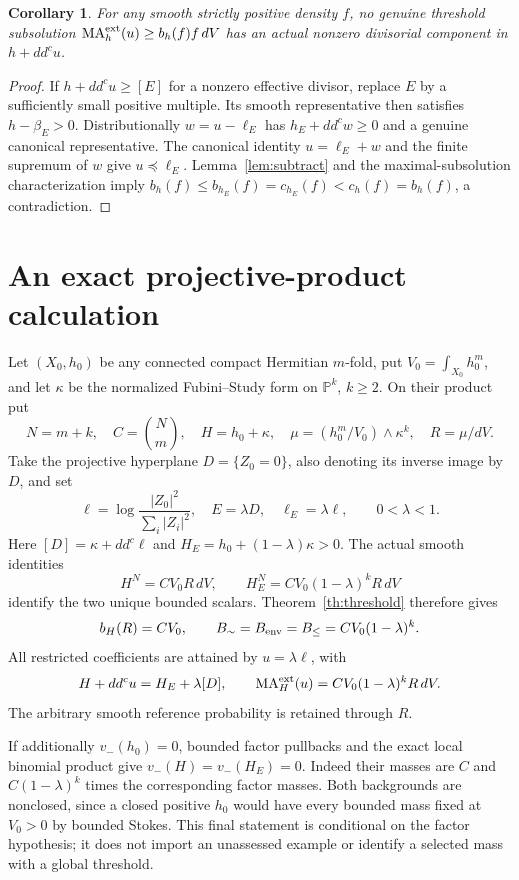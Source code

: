 \documentclass[11pt]{article}
\newcommand{\ddc}{dd^c}
\newcommand{\MA}{\operatorname{MA}}
\newtheorem{corollary}[theorem]{Corollary}
\theoremstyle{remark}\newtheorem{remark}[theorem]{Remark}
\begin{document}
\begin{corollary}\label{cor:smooth}
For any smooth strictly positive density $f$, no genuine threshold
subsolution $\MA_h^{\rm ext}(u)\geq b_h(f)f\,dV$ has an actual nonzero
divisorial component in $h+\ddc u$.
\end{corollary}
\begin{proof}
If $h+\ddc u\geq[E]$ for a nonzero effective divisor, replace $E$
by a sufficiently small positive multiple. Its smooth representative
then satisfies $h-\beta_E>0$. Distributionally
$w=u-\ell_E$ has $h_E+\ddc w\geq0$ and a genuine canonical
representative. The canonical identity $u=\ell_E+w$ and the finite
supremum of $w$ give $u\preceq\ell_E$. Lemma~\ref{lem:subtract} and
the maximal-subsolution characterization imply
$b_h(f)\leq b_{h_E}(f)=c_{h_E}(f)<c_h(f)=b_h(f)$, a contradiction.
\end{proof}

\section{An exact projective-product calculation}
Let $(X_0,h_0)$ be any connected compact Hermitian $m$-fold, put
$V_0=\int_{X_0}h_0^m$, and let $\kappa$ be the normalized
Fubini--Study form on $\mathbb P^k$, $k\geq2$. On their product put
\[
 N=m+k,\quad C=\binom Nm,\quad H=h_0+\kappa,\quad
 \mu=(h_0^m/V_0)\wedge\kappa^k,\quad R=\mu/dV.
\]
Take the projective hyperplane $D=\{Z_0=0\}$, also denoting its
inverse image by $D$, and set
\[
 \ell=\log\frac{|Z_0|^2}{\sum_i|Z_i|^2},\quad
 E=\lambda D,\quad\ell_E=\lambda\ell,\qquad 0<\lambda<1.
\]
Here $[D]=\kappa+\ddc\ell$ and
$H_E=h_0+(1-\lambda)\kappa>0$. The actual smooth identities
\[
 H^N=CV_0R\,dV,\qquad
 H_E^N=CV_0(1-\lambda)^kR\,dV
\]
identify the two unique bounded scalars. Theorem~\ref{th:threshold}
therefore gives
\[
 b_H(R)=CV_0,\qquad
 B_{\sim}=B_{\rm env}=B_{\leq}=CV_0(1-\lambda)^k.
\]
All restricted coefficients are attained by $u=\lambda\ell$, with
\[
 H+\ddc u=H_E+\lambda[D],\qquad
 \MA_H^{\rm ext}(u)=CV_0(1-\lambda)^kR\,dV.
\]
The arbitrary smooth reference probability is retained through $R$.

If additionally $v_-(h_0)=0$, bounded factor pullbacks and the exact
local binomial product give $v_-(H)=v_-(H_E)=0$. Indeed their masses
are $C$ and $C(1-\lambda)^k$ times the corresponding factor masses.
Both backgrounds are nonclosed, since a closed positive $h_0$ would
have every bounded mass fixed at $V_0>0$ by bounded Stokes.
This final statement is conditional on the factor hypothesis; it does
not import an unassessed example or identify a selected mass with a
global threshold.
\end{document}
